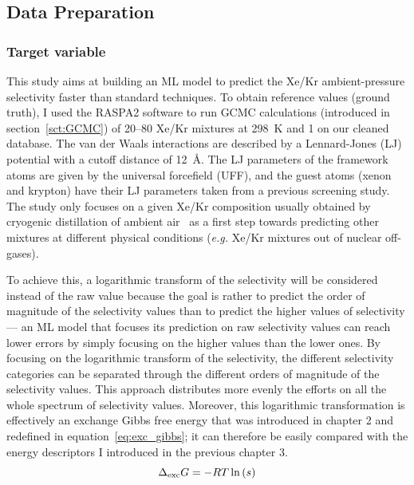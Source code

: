 \documentclass[main]{subfiles}
\begin{document}
\subsection{Data Preparation}


\subsubsection{Target variable}

This study aims at building an ML model to predict the Xe/Kr ambient-pressure selectivity faster than standard techniques. To obtain reference values (ground truth), I used the RASPA2 software\autocite{dubbeldam2016} to run GCMC calculations (introduced in section~\ref{sct:GCMC}) of 20–80 Xe/Kr mixtures at \SI{298}{\kelvin} and \SI{1}{\atm} on our cleaned database. The van der Waals interactions are described by a Lennard-Jones (LJ) potential with a cutoff distance of \SI{12}{\angstrom}. The LJ parameters of the framework atoms are given by the universal forcefield (UFF),\autocite{rappe1992} and the guest atoms (xenon and krypton) have their LJ parameters taken from a previous screening study.\autocite{Ryan_2010} The study only focuses on a given Xe/Kr composition usually obtained by cryogenic distillation of ambient air~\autocite{kerry2007industrial} as a first step towards predicting other mixtures at different physical conditions (\emph{e.g.} Xe/Kr mixtures out of nuclear off-gases). 

To achieve this, a logarithmic transform of the selectivity will be considered instead of the raw value because the goal is rather to predict the order of magnitude of the selectivity values than to predict the higher values of selectivity --- an ML model that focuses its prediction on raw selectivity values can reach lower errors by simply focusing on the higher values than the lower ones. By focusing on the logarithmic transform of the selectivity, the different selectivity categories can be separated through the different orders of magnitude of the selectivity values. This approach distributes more evenly the efforts on all the whole spectrum of selectivity values. Moreover, this logarithmic transformation is effectively an exchange Gibbs free energy that was introduced in chapter 2 and redefined in equation~\ref{eq:exc_gibbs}; it can therefore be easily compared with the energy descriptors I introduced in the previous chapter 3.
\begin{equation}\label{eq:exc_gibbs}
  \Delta_{\text{exc}}G = -RT \ln\left(s\right)
\end{equation}
\end{document}
